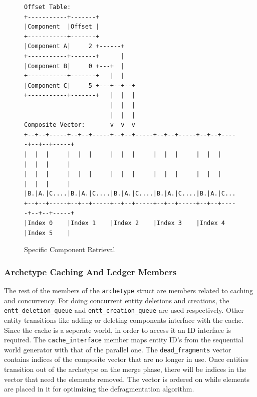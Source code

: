 \begin{figure}[H]
\begin{verbatim}
Offset Table:                                                             
+-----------+-------+                                                     
|Component  |Offset |                                                     
+-----------+-------+                                                     
|Component A|     2 +------+                                              
+-----------+-------+      |                                              
|Component B|     0 +---+  |                                              
+-----------+-------+   |  |                                              
|Component C|     5 +---+--+--+                                           
+-----------+-------+   |  |  |                                           
                        |  |  |                                           
                        |  |  |                                           
Composite Vector:       v  v  v                                           
+--+--+-----+--+--+-----+--+--+-----+--+--+-----+--+--+-----+--+--+-----+ 
|  |  |     |  |  |     |  |  |     |  |  |     |  |  |     |  |  |     | 
|  |  |     |  |  |     |  |  |     |  |  |     |  |  |     |  |  |     | 
|B.|A.|C....|B.|A.|C....|B.|A.|C....|B.|A.|C....|B.|A.|C....|B.|A.|C....| 
+--+--+-----+--+--+-----+--+--+-----+--+--+-----+--+--+-----+--+--+-----+ 
|Index 0    |Index 1    |Index 2    |Index 3    |Index 4    |Index 5    | 
\end{verbatim}
\caption{Specific Component Retrieval}
\label{code:component_retrieval}
\end{figure}

\subsubsection{Archetype Caching And Ledger Members}
The rest of the members of the \texttt{archetype} struct are members related to caching and concurrency. For doing concurrent entity deletions and creations, the \texttt{entt\_deletion\_queue} and \texttt{entt\_creation\_queue} are used respectively. Other entity transitions like adding or deleting components interface with the cache. Since the cache is a seperate world, in order to access it an ID interface is required. The \texttt{cache\_interface} member maps entity ID's from the sequential world generator with that of the parallel one. The \texttt{dead\_fragments} vector contains indices of the composite vector that are no longer in use. Once entities transition out of the archetype on the merge phase, there will be indices in the vector that need the elements removed. The vector is ordered on while elements are placed in it for optimizing the defragmentation algorithm.

